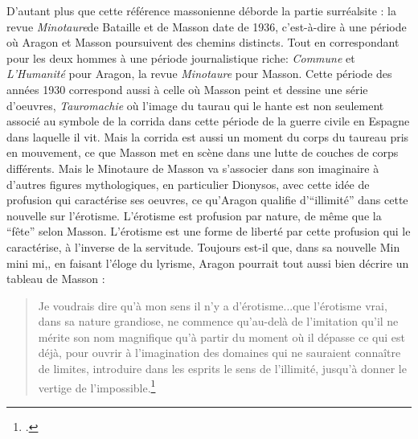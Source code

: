 	 D'autant plus que cette référence massonienne déborde la partie surréalsite : la revue \emph{Minotaure}de Bataille et de Masson date de 1936, c'est-à-dire à une période où Aragon et Masson poursuivent des chemins distincts. Tout en correspondant pour les deux hommes à une période journalistique riche: \emph{Commune} et \emph{L'Humanité} pour Aragon, la revue \emph{Minotaure} pour Masson. Cette période des années 1930 correspond aussi à celle où Masson peint et dessine une série d'oeuvres, \emph{Tauromachie} où l'image du taurau qui le hante est non seulement associé au symbole de la corrida dans cette période de la guerre civile en Espagne dans laquelle il vit. Mais la corrida est aussi un moment du corps du taureau pris en mouvement, ce que Masson met en scène dans une lutte de couches de corps différents. Mais le Minotaure de Masson va s'associer dans son imaginaire à d'autres figures mythologiques, en particulier Dionysos, avec cette idée de profusion qui caractérise ses oeuvres, ce qu'Aragon qualifie d'\enquote{illimité} dans cette nouvelle sur l'érotisme. L'érotisme est profusion par nature, de même que la \enquote{fête} selon Masson. L'érotisme est une forme de liberté par cette profusion qui le caractérise, à l'inverse de la servitude. Toujours est-il que, dans sa nouvelle {Min mini mi,}, en faisant l'éloge du lyrisme, Aragon pourrait tout aussi bien décrire un tableau de Masson : 

\begin{quote}
Je voudrais dire qu'à mon sens il n'y a d'érotisme...que l'érotisme vrai, dans sa nature grandiose, ne commence qu'au-delà de l'imitation qu'il ne mérite son nom magnifique qu'à partir du moment où il dépasse ce qui est déjà, pour ouvrir à l'imagination des domaines qui ne sauraient connaître de limites, introduire dans les esprits le sens de l'illimité, jusqu'à donner le vertige de l'impossible.\footcite[p496]{mentirvrai}\end{quote}

